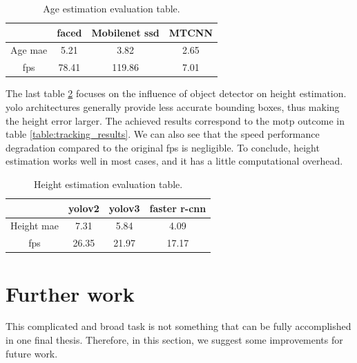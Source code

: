     \begin{table}[h]
        \centering
        \begin{tabular}{|c|c|c|c|}
            \hline
            \rowcolor{Blue}
            \color{White}\textbf{} & \color{White}\textbf{faced} & \color{White}\textbf{Mobilenet \gls{ssd}} & \color{White}\textbf{MTCNN} \\ \hline \hline
                Age \gls{mae} & 5.21 & 3.82 & 2.65  \\ \hline
                \gls{fps} & 78.41 & 119.86 & 7.01 \\ \hline
        \end{tabular}
        \caption{Age estimation evaluation table.}
        \label{table:age_estimation_results}
    \end{table}

    The last table \ref{table:height_estimation_results} focuses on the influence of object detector on height estimation. \Gls{yolo} architectures generally provide less accurate bounding boxes, thus making the height error larger. The achieved results correspond to the \gls{motp} outcome in table \ref{table:tracking_results}. We can also see that the speed performance degradation compared to the original \gls{fps} is negligible. To conclude, height estimation works well in most cases, and it has a little computational overhead.
    
       \begin{table}[h]
        \centering
        \begin{tabular}{|c|c|c|c|}
            \hline
            \rowcolor{Blue}
            \color{White}\textbf{} & \color{White}\textbf{\gls{yolo}v2} & \color{White}\textbf{\gls{yolo}v3} & \color{White}\textbf{\gls{faster r-cnn}} \\ \hline \hline
                Height \gls{mae} & 7.31  & 5.84 & 4.09  \\ \hline
                \gls{fps} & 26.35  & 21.97 &  17.17 \\ \hline
        \end{tabular}
        \caption{Height estimation evaluation table.}
        \label{table:height_estimation_results}
    \end{table}
    
\section{Further work}
    This complicated and broad task is not something that can be fully accomplished in one final thesis. Therefore, in this section, we suggest some improvements for future work.
    
